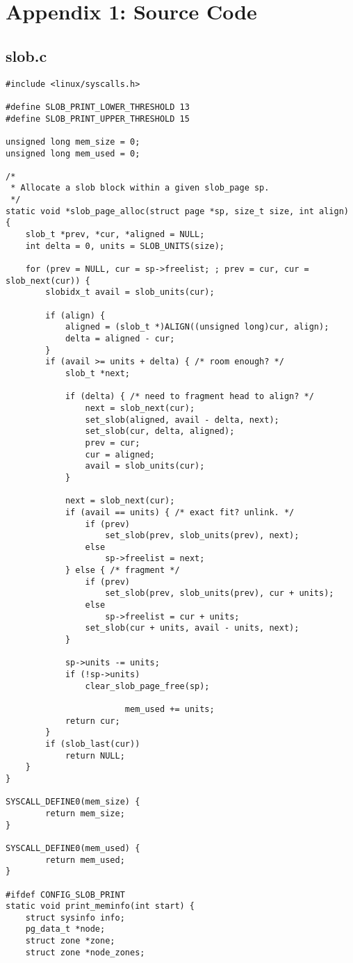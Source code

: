\documentclass[letterpaper,10pt,titlepage,draftclsnofoot,onecolumn]{article}
\begin{document}
\section*{Appendix 1: Source Code}
\subsection*{slob.c}

\lstset{
  language=C,
  basicstyle=\footnotesize
}

\begin{lstlisting}
#include <linux/syscalls.h>

#define SLOB_PRINT_LOWER_THRESHOLD 13
#define SLOB_PRINT_UPPER_THRESHOLD 15

unsigned long mem_size = 0;
unsigned long mem_used = 0;

/*
 * Allocate a slob block within a given slob_page sp.
 */
static void *slob_page_alloc(struct page *sp, size_t size, int align)
{
	slob_t *prev, *cur, *aligned = NULL;
	int delta = 0, units = SLOB_UNITS(size);

	for (prev = NULL, cur = sp->freelist; ; prev = cur, cur = slob_next(cur)) {
		slobidx_t avail = slob_units(cur);

		if (align) {
			aligned = (slob_t *)ALIGN((unsigned long)cur, align);
			delta = aligned - cur;
		}
		if (avail >= units + delta) { /* room enough? */
			slob_t *next;

			if (delta) { /* need to fragment head to align? */
				next = slob_next(cur);
				set_slob(aligned, avail - delta, next);
				set_slob(cur, delta, aligned);
				prev = cur;
				cur = aligned;
				avail = slob_units(cur);
			}

			next = slob_next(cur);
			if (avail == units) { /* exact fit? unlink. */
				if (prev)
					set_slob(prev, slob_units(prev), next);
				else
					sp->freelist = next;
			} else { /* fragment */
				if (prev)
					set_slob(prev, slob_units(prev), cur + units);
				else
					sp->freelist = cur + units;
				set_slob(cur + units, avail - units, next);
			}

			sp->units -= units;
			if (!sp->units)
				clear_slob_page_free(sp);

                        mem_used += units;
			return cur;
		}
		if (slob_last(cur))
			return NULL;
	}
}

SYSCALL_DEFINE0(mem_size) {
        return mem_size;
}

SYSCALL_DEFINE0(mem_used) {
        return mem_used;
}

#ifdef CONFIG_SLOB_PRINT
static void print_meminfo(int start) {
	struct sysinfo info;
	pg_data_t *node;
	struct zone *zone;
	struct zone *node_zones;


\end{lstlisting}
\end{document}
